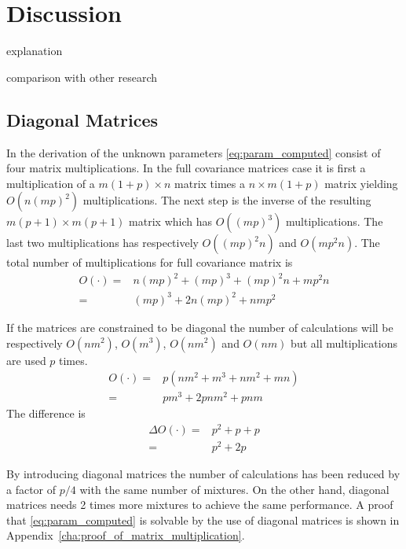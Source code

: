 \chapter{Discussion} %
\label{cha:discussion}
explanation

comparison with other research

\section{Diagonal Matrices} %
\label{sec:diagonal_matrices}
In the derivation of the unknown parameters \eqref{eq:param_computed} consist of four matrix multiplications. In the full covariance matrices case it is first a multiplication of a $m(1+p)\times n$ matrix times a $n\times m(1+p)$ matrix yielding $O(n(mp)^2)$ multiplications. The next step is the inverse of the resulting $m(p+1)\times m(p+1)$ matrix which has $O((mp)^3)$ multiplications. The last two multiplications has respectively $O((mp)^2n)$ and $O(mp^2n)$. The total number of multiplications for full covariance matrix is
\begin{equation}
	\begin{split}
		O(\cdot) = & n(mp)^2 + (mp)^3 + (mp)^2n + mp^2n \\
		= & (mp)^3 + 2n(mp)^2 + nmp^2
	\end{split}
\end{equation}

If the matrices are constrained to be diagonal the number of calculations will be respectively $O(nm^2)$, $O(m^3)$, $O(nm^2)$ and $O(nm)$ but all multiplications are used $p$ times.
\begin{equation}
	\begin{split}
		O(\cdot) = & p(nm^2 + m^3 + nm^2 + mn) \\
		= & pm^3 + 2pnm^2 + pnm
	\end{split}
\end{equation}
The difference is
\begin{equation}
	\begin{split}
		\Delta O(\cdot) = & p^2 + p + p \\
		= & p^2 +2p
	\end{split}
\end{equation}

By introducing diagonal matrices the number of calculations has been reduced by a factor of $p/4$ \cite{stylianou98} with the same number of mixtures. On the other hand, diagonal matrices needs 2 times more mixtures to achieve the same performance. A proof that \eqref{eq:param_computed} is solvable by the use of diagonal matrices is shown in Appendix~\ref{cha:proof_of_matrix_multiplication}. 


